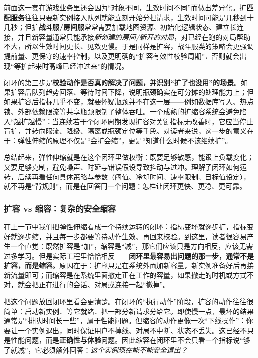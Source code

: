 前面这一套在游戏业务里还会因为“对象不同，生效时间不同”而做出差异化。扩\textbf{匹配服务}往往只要新实例接入队列就能立刻开始分担请求，生效时间可能是几秒到十几秒；但扩\textbf{战斗服/房间服}常常需要加载地图资源、初始化逻辑状态、建立长连接，并且新容量通常只能承接\emph{新创建的房间/新开的对局}，对已经在跑的对局帮助不大，所以生效时间更长、见效更慢。于是同样是扩容，战斗服类的策略会更强调提前量、更保守的速率控制，以及更明确的“扩容有效性校验周期”，否则就会出现“等扩起来时高峰已经冲过来”的情况。

闭环的第三步是\textbf{校验动作是否真的解决了问题，并识别“扩了也没用”的场景}。如果扩容后队列趋势回落、等待时间下降，说明瓶颈确实在可分摊的处理能力上；但如果扩容后指标几乎不变，就要怀疑瓶颈并不在这一层——例如数据库写入、热点锁、外部依赖限流等共享瓶颈限制了整体吞吐。一个成熟的扩缩容系统会避免陷入“越扩越慢”：当连续若干个闭环周期发现扩容对关键指标无改善时，它应当停止盲扩，并转向限流、降级、隔离或瓶颈定位等手段。对读者来说，这一步的意义在于：弹性伸缩的原理不仅是“会扩会缩”，更是“知道什么时候不该继续扩”。

总结起来，弹性伸缩就是在这个闭环里做权衡：既要足够敏感，能跟上负载变化；又要足够克制，避免噪声、时延与错误假设导致抖动与过冲。理解了闭环如何运转，后续再看任何具体策略与参数（阈值、冷却时间、速率限制、目标值设定），就不再是“背规则”，而是在回答同一个问题：怎样让闭环更快、更稳、更可靠。

\subsubsection{扩容 vs 缩容：复杂的安全缩容}
在上一节中我们把弹性伸缩看成一个持续运转的闭环：指标变坏就逐步扩，指标变好就逐步缩，并且每一步都要等待动作生效、再回来校验。到这里，读者很容易产生一个直觉：既然扩容是“加”，缩容是“减”，那它们应该只是方向相反，应该无需过多学习。但是实际工程里恰恰相反——\textbf{闭环里最容易出问题的那一步，通常不是扩容，而是缩容。}原因在于：扩容只是在系统外面加新容量，新实例准备好后再接新流量即可；而缩容是在系统里面撤走正在工作的容量，如果撤走的时机或方式不对，就会把正在进行的会话、对局或连接一起“撤掉”。

把这个问题放回闭环里看会更清楚。在闭环的“执行动作”阶段，扩容的动作往往很简单：启动新实例、等它就绪、把一部分新请求分给它。即使慢一点，最坏的结果通常是“排队时间长一些”，属于性能问题。但缩容的动作更像一次“下线操作”：你要让一个实例退出，同时保证用户不掉线、对局不中断、状态不丢失。这已经不只是性能问题，而是\textbf{正确性与体验}问题。因此缩容在闭环里不会只看一个指标说“够了就减”，它必须额外回答：\emph{这个实例现在能不能安全退出？}

